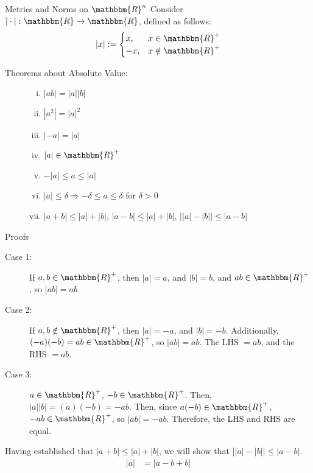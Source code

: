\documentclass[10pt]{extarticle}
\newcommand{\R}{\mathbbm{R}}
\begin{document}
  \begin{problem}{Metrics and Norms on $\R^n$}
    Consider $|\cdot|: \R \rightarrow \R$, defined as follows:
    \[
      |x| := \begin{cases}
        x,&x\in\R^+\\
        -x,&x\notin\R^+
      \end{cases}
    \] 
    \begin{description}
      \item[Theorems about Absolute Value:]\hfill
        \begin{enumerate}[(i)]
          \item $|ab| = |a||b|$
          \item $|a^2| = |a|^2$
          \item $|-a| = |a|$
          \item $|a|\in\R^+$
          \item $-|a| \leq a \leq |a|$
          \item $|a| \leq \delta \Rightarrow -\delta \leq a \leq \delta$ for $\delta > 0$
          \item $|a+b| \leq |a| + |b|$, $|a-b| \leq |a| + |b|$, $\vert|a| - |b|\vert \leq |a-b|$
        \end{enumerate}
    \end{description}
    \begin{problem}{Proofs}
      \begin{description}[font=\normalfont]
        \item[Proof of (i)]\hfill
          \begin{description}
            \item[Case 1:] If $a,b\in\R^+$, then $|a| = a$, and $|b| = b$, and $ab \in \R^+$, so $|ab| = ab$
            \item[Case 2:] If $a,b\notin\R^+$, then $|a| = -a$, and $|b| = -b$. Additionally, $(-a)(-b)=ab \in\R^+$, so $|ab| = ab$. The LHS $=ab$, and the RHS $=ab$.
            \item[Case 3:] $a\in\R^+$, $-b\in\R^+$. Then, $|a||b| = (a)(-b) = -ab$. Then, since $a(-b)\in\R^+$, $-ab\in\R^+$, so $|ab| = -ab$. Therefore, the LHS and RHS are equal.
          \end{description}
        \item[Proof of (vii)] Having established that $|a+b| \leq |a| + |b|$, we will show that $\vert|a| - |b|\vert \leq |a-b|$.
          \begin{align*}
            |a| &= |a-b+b| \\

\end{align*}
\end{description}
\end{problem}
\end{problem}
\end{document}
